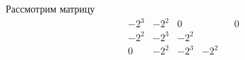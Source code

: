 \begin{example}
  Рассмотрим матрицу
  \[\begin{array}{ccccc}
      -2^3 & -2^2 & 0    &      &  & 0 \\
      -2^2 & -2^3 & -2^2 &      &  &   \\
      0    & -2^2 & -2^3 & -2^2 &  &   \\
    \end{array}\]
\end{example}

